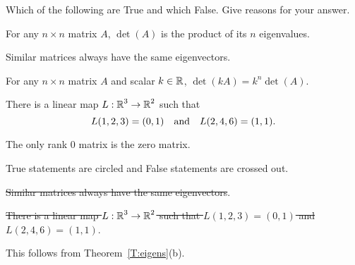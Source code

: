 \documentclass{ximera}
\author{Matthew Carr \& Marty Golubitsky}
\begin{document}

\begin{exercise}\label{mc.exercise12}
Which of the following are True and which False.  Give reasons for your answer.
\begin{enumeratea}
\item For any $n \times n$ matrix $A$, $\det(A)$ is the product of its $n$ eigenvalues.
\item Similar matrices always have the same eigenvectors.
\item For any $n \times n$ matrix $A$ and scalar $k\in\mbox{$\mathbb{R}$}$, $\det(kA) = k^n \det(A)$.
\item There is a linear map $L: \mbox{$\mathbb{R}$}^3 \to \mbox{$\mathbb{R}$}^2$ such that 
\[
L(1,2,3) = (0,1) \quad\mbox{and}\quad L(2,4,6) = (1,1).
\]
\item The only rank $0$ matrix is the zero matrix.
\end{enumeratea}

\begin{solution}

\ans 
True statements are circled and False statements are crossed out.


\begin{enumeratea}

\item {}
\item \sout{Similar matrices always have the same eigenvectors}.
\item {}
\item \sout{There is a linear map $L: \mbox{$\mathbb{R}$}^3 \to \mbox{$\mathbb{R}$}^2$ such that $L(1,2,3) = (0,1)$ and $L(2,4,6) = (1,1)$}.
\item {}
\end{enumeratea}

\soln \begin{enumeratea}

\item This follows from Theorem~\ref{T:eigens}(b).


\end{enumeratea}
\end{solution}
\end{exercise}
\end{document}
